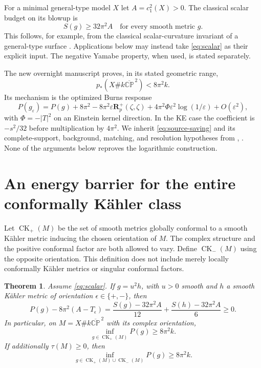 \documentclass[11pt,a4paper]{article}
\numberwithin{equation}{section}
\newtheorem{theorem}{Theorem}[section]
\theoremstyle{definition}\newtheorem{hypothesis}[theorem]{Input}
\theoremstyle{remark}\newtheorem{remark}[theorem]{Remark}
\newcommand{\CK}{\operatorname{CK}}
\newcommand{\CP}{\mathbb{CP}}
\begin{document}
For a minimal general-type model $X$ let $A=c_1^2(X)>0$.
The classical scalar budget on its blowup is
\begin{equation}\label{eq:scalar}
 S(g)\ge32\pi^2A\quad\text{for every smooth metric }g.
\end{equation}
This follows, for example, from the classical scalar-curvature invariant
of a general-type surface \cite[Introduction]{LeBrun}.
Applications below may instead take \eqref{eq:scalar} as their explicit
input.  The negative Yamabe property, when used, is stated separately.

The new overnight manuscript proves, in its stated geometric range,
\begin{equation}\label{eq:source-saving}
 p_*(X\#k\overline{\CP}^{\,2})<8\pi^2 k.
\end{equation}
Its mechanism is the optimized Burns response
\begin{equation}
 P(g_\varepsilon)=P(g)+8\pi^2
 -8\pi^2\varepsilon\mathbf R^+_p(\zeta,\zeta)
 +4\pi^2\Phi\varepsilon^2\log(1/\varepsilon)+O(\varepsilon^2),
\end{equation}
with $\Phi=-|T|^2$ on an Einstein kernel direction.  In the KE case the
coefficient is $-s^2/32$ before multiplication by $4\pi^2$.
We inherit \eqref{eq:source-saving} and its complete-support, background,
matching, and resolution hypotheses from \cite[Section 3]{Synthesis},
\cite[A01.52 and corrected A02.59D]{Companion}.  None of the arguments below
reproves the logarithmic construction.

\section{An energy barrier for the entire conformally K\"ahler class}

Let $\CK_+(M)$ be the set of smooth metrics globally conformal to a smooth
K\"ahler metric inducing the chosen orientation of $M$.  The complex
structure and the positive conformal factor are both allowed to vary.
Define $\CK_-(M)$ using the opposite orientation.  This definition does not
include merely locally conformally K\"ahler metrics or singular conformal
factors.

\begin{theorem}\label{thm:CK}
Assume \eqref{eq:scalar}.  If $g=u^2h$, with $u>0$ smooth and $h$ a smooth
K\"ahler metric of orientation $\epsilon\in\{+,-\}$, then
\begin{equation}\label{eq:CKexact}
 \boxed{P(g)-8\pi^2(A-T_\epsilon)
 =\frac{S(g)-32\pi^2A}{12}
  +\frac{S(h)-32\pi^2A}{6}\ge0.}
\end{equation}
In particular, on $M=X\#k\overline{\CP}^{\,2}$ with its complex orientation,
\begin{equation}\label{eq:CKbarrier}
 \inf_{g\in\CK_+(M)}P(g)\ge8\pi^2 k.
\end{equation}
If additionally $\tau(M)\ge0$, then
\begin{equation}\label{eq:bothCK}
 \inf_{g\in\CK_+(M)\cup\CK_-(M)}P(g)\ge8\pi^2k.
\end{equation}
\end{theorem}
\end{document}
